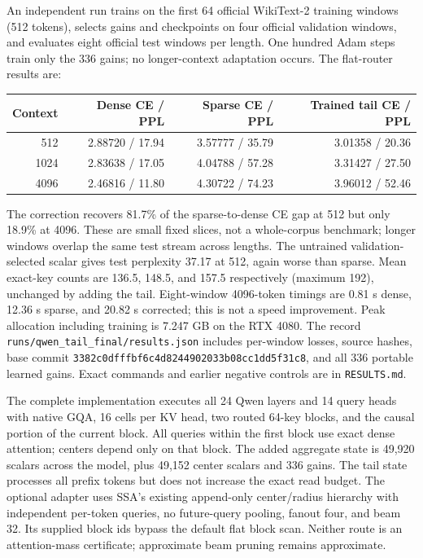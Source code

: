 \documentclass[11pt]{article}
\numberwithin{equation}{section}
\begin{document}
An independent run trains on the first 64 official WikiText-2 training windows (512 tokens), selects gains
and checkpoints on four official validation windows, and evaluates eight official test windows per length.
One hundred Adam steps train only the 336 gains; no longer-context adaptation occurs. The flat-router
results are:
\begin{center}\small
\begin{tabular}{rrrr}\toprule
Context & Dense CE / PPL & Sparse CE / PPL & Trained tail CE / PPL\\\midrule
512 & 2.88720 / 17.94 & 3.57777 / 35.79 & 3.01358 / 20.36\\
1024 & 2.83638 / 17.05 & 4.04788 / 57.28 & 3.31427 / 27.50\\
4096 & 2.46816 / 11.80 & 4.30722 / 74.23 & 3.96012 / 52.46\\\bottomrule
\end{tabular}
\end{center}
The correction recovers 81.7\% of the sparse-to-dense CE gap at 512 but only 18.9\% at 4096. These are small
fixed slices, not a whole-corpus benchmark; longer windows overlap the same test stream across lengths.
The untrained validation-selected scalar gives test perplexity 37.17 at 512, again worse than sparse.
Mean exact-key counts are 136.5, 148.5, and 157.5 respectively (maximum 192), unchanged by adding the tail.
Eight-window 4096-token timings are 0.81 s dense, 12.36 s sparse, and 20.82 s corrected; this is not a speed
improvement. Peak allocation including training is 7.247 GB on the RTX 4080. The record
\texttt{runs/qwen\_tail\_final/results.json} includes per-window losses, source hashes, base commit
\texttt{3382c0dfffbf6c4d8244902033b08cc1dd5f31c8}, and all 336 portable learned gains. Exact commands and
earlier negative controls are in \texttt{RESULTS.md}.

The complete implementation executes all 24 Qwen layers and 14 query heads with native GQA, 16 cells per
KV head, two routed 64-key blocks, and the causal portion of the current block. All queries within the first
block use exact dense attention; centers depend only on that block. The added aggregate state is 49,920
scalars across the model, plus 49,152 center scalars and 336 gains. The tail state processes all prefix tokens
but does not increase the exact read budget. The optional adapter uses SSA's existing append-only center/radius
hierarchy with independent per-token queries, no future-query pooling, fanout four, and beam 32. Its supplied
block ids bypass the default flat block scan. Neither route is an attention-mass certificate; approximate beam
pruning remains approximate.
\end{document}
